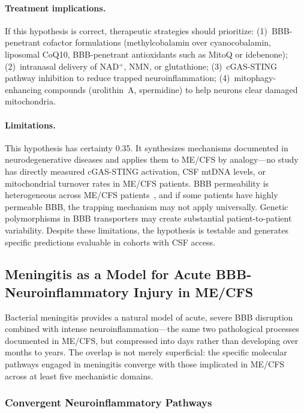 \begin{speculation}
\paragraph{Treatment implications.}
If this hypothesis is correct, therapeutic strategies should prioritize: (1)~BBB-penetrant cofactor formulations (methylcobalamin over cyanocobalamin, liposomal CoQ10, BBB-penetrant antioxidants such as MitoQ or idebenone); (2)~intranasal delivery of NAD$^+$, NMN, or glutathione; (3)~cGAS-STING pathway inhibition to reduce trapped neuroinflammation; (4)~mitophagy-enhancing compounds (urolithin~A, spermidine) to help neurons clear damaged mitochondria.

\paragraph{Limitations.}
This hypothesis has certainty 0.35. It synthesizes mechanisms documented in neurodegenerative diseases and applies them to ME/CFS by analogy---no study has directly measured cGAS-STING activation, CSF mtDNA levels, or mitochondrial turnover rates in ME/CFS patients. BBB permeability is heterogeneous across ME/CFS patients~\cite{Natelson_BBB_MECFS_2001}, and if some patients have highly permeable BBB, the trapping mechanism may not apply universally. Genetic polymorphisms in BBB transporters may create substantial patient-to-patient variability. Despite these limitations, the hypothesis is testable and generates specific predictions evaluable in cohorts with CSF access.
\end{speculation}

\subsection{Meningitis as a Model for Acute BBB-Neuroinflammatory Injury in ME/CFS}
\label{sec:meningitis-bbb}

Bacterial meningitis provides a natural model of acute, severe BBB disruption combined with intense neuroinflammation---the same two pathological processes documented in ME/CFS, but compressed into days rather than developing over months to years. The overlap is not merely superficial: the specific molecular pathways engaged in meningitis converge with those implicated in ME/CFS across at least five mechanistic domains.

\subsubsection{Convergent Neuroinflammatory Pathways}

